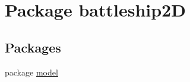 \hypertarget{namespacebattleship2D}{\section{Package battleship2\-D}
\label{namespacebattleship2D}
}
\subsection*{Packages}
\begin{DoxyCompactItemize}
\item 
package \hyperlink{namespacebattleship2D_1_1model}{model}
\end{DoxyCompactItemize}
